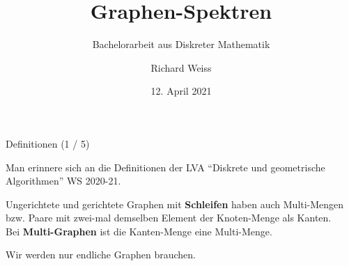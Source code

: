 \documentclass[aspectratio=169]{beamer}
\title[Graphen-Spektren]{Graphen-Spektren}
\subtitle{Bachelorarbeit aus Diskreter Mathematik}
\author[R. Weiss]{Richard Weiss}
\institute[TU Wien]{TU Wien, Vienna, Austria}
\date{12. April 2021}
\begin{document}
\begin{frame}
    \titlepage
\end{frame}            


\begin{frame}{Definitionen (1 / 5)}

    Man erinnere sich an die Definitionen der LVA \enquote{Diskrete und geometrische Algorithmen} WS 2020-21.

    \begin{definition*}
        Ungerichtete und gerichtete Graphen mit \textbf{Schleifen} haben auch Multi-Mengen bzw. Paare mit zwei-mal demselben Element der Knoten-Menge als Kanten. \\
        Bei \textbf{Multi-Graphen} ist die Kanten-Menge eine Multi-Menge.
    \end{definition*}

    Wir werden nur endliche Graphen brauchen.

\end{frame}
\end{document}
